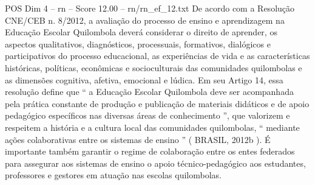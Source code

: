 \begin{textsample}{POS Dim 4 – rn – Score 12.00 – rn/rn\_ef\_12.txt}
De acordo com a Resolução CNE/CEB n. 8/2012, a avaliação do processo de ensino e aprendizagem na Educação Escolar Quilombola deverá considerar o direito de aprender, os aspectos qualitativos, diagnósticos, processuais, formativos, dialógicos e participativos do processo educacional, as experiências de vida e as características históricas, políticas, econômicas e socioculturais das comunidades quilombolas e as dimensões cognitiva, afetiva, emocional e lúdica.
Em seu Artigo 14, essa resolução define que “ a Educação Escolar Quilombola deve ser acompanhada pela prática constante de produção e publicação de materiais didáticos e de apoio pedagógico específicos nas diversas áreas de conhecimento ”, que valorizem e respeitem a história e a cultura local das comunidades quilombolas, “ mediante ações colaborativas entre os sistemas de ensino ” ( BRASIL, 2012b ).
É importante também garantir o regime de colaboração entre os entes federados para assegurar aos sistemas de ensino o apoio técnico-pedagógico aos estudantes, professores e gestores em atuação nas escolas quilombolas.

\end{textsample}
